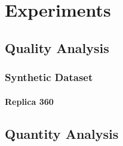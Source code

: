\chapter{Experiments}


\section{Quality Analysis}



\subsection{Synthetic Dataset}


\subsubsection{Replica 360}






\section{Quantity Analysis}


